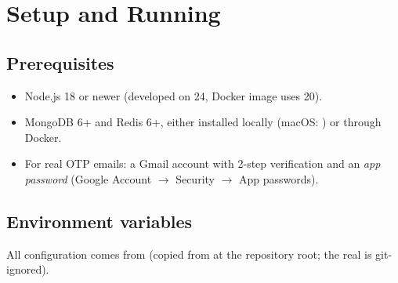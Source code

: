 \chapter{Setup and Running}\label{ch:setup}

\section{Prerequisites}

\begin{itemize}
  \item Node.js 18 or newer (developed on 24, Docker image uses 20).
  \item MongoDB 6+ and Redis 6+, either installed locally (macOS:
    ) or through Docker.
  \item For real OTP emails: a Gmail account with 2-step verification and an
    \emph{app password} (Google Account $\to$ Security $\to$ App passwords).
\end{itemize}

\section{Environment variables}\label{sec:env}

All configuration comes from 
(copied from  at the repository root; the real
 is git-ignored).

